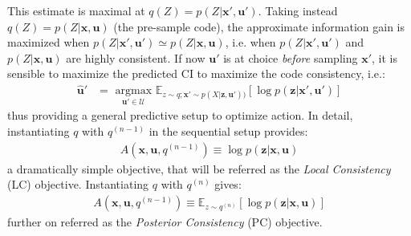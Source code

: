 \documentclass{article}
\begin{document}
This estimate is maximal at $q(Z) = p(Z|\boldsymbol{x}', \boldsymbol{u}')$. 
Taking instead $q(Z)= p(Z|\boldsymbol{x}, \boldsymbol{u})$ (the pre-sample code), the 
approximate information gain is maximized when $p(Z|\boldsymbol{x}', \boldsymbol{u}')\simeq p(Z|\boldsymbol{x}, \boldsymbol{u})$, i.e. when $p(Z|\boldsymbol{x}', \boldsymbol{u}')$ and $p(Z|\boldsymbol{x}, \boldsymbol{u})$ are highly consistent. If now $\boldsymbol{u}'$ is at choice \emph{before} sampling  $\boldsymbol{x}'$, it is sensible to maximize the predicted CI to maximize the code consistency, i.e.:
\begin{align}
\hat{\boldsymbol{u}}' 
&= \underset{\boldsymbol{u}' \in \mathcal{U}}{\text{ argmax }} \mathbb{E}_{z\sim q; \boldsymbol{x}'\sim p(X|\boldsymbol{z},\boldsymbol{u}'))} 
\left[\log p(\boldsymbol{z}|\boldsymbol{x}', \boldsymbol{u}')\right]
\end{align}
thus providing a general predictive setup to optimize action.
In detail, instantiating $q$ with $q^{(n-1)}$ in the sequential setup provides:
\begin{align}A(\boldsymbol{x}, \boldsymbol{u}, q^{(n-1)}) \equiv \log p(\boldsymbol{z}|\boldsymbol{x}, \boldsymbol{u})\label{eq:LC}
\end{align}
a dramatically simple objective, that will be referred as the \emph{Local Consistency} (LC) objective.
Instantiating $q$ with $q^{(n)}$ gives:
\begin{align}A(\boldsymbol{x}, \boldsymbol{u}, q^{(n-1)}) \equiv 
\mathbb{E}_{z\sim q^{(n)}} \left[\log p(\boldsymbol{z}|\boldsymbol{x}, \boldsymbol{u})\right]\label{eq:PC}
\end{align}
further on referred as the \emph{Posterior Consistency} (PC) objective.
\end{document}
